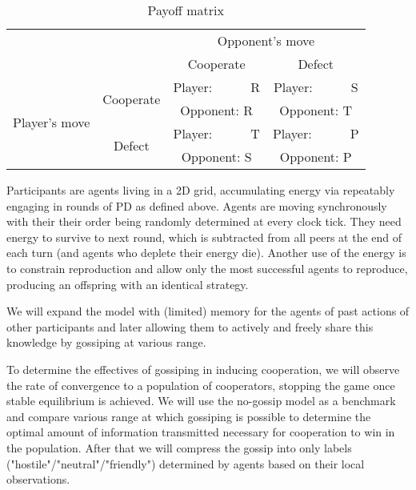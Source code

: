\documentclass[english]{article}
\begin{document}
\begin{table}[h!]
  \centering
  \begin{tabular}{c c||c|c}
    & & \multicolumn{2}{c}{Opponent's move} \\
    & & Cooperate & Defect \\
    \hline\hline

    \multirow{4}{6em}{Player's move}
    & \multirow{2}{5em}{Cooperate}
      & Player:\ \ \ \ \ \ R & Player:\ \ \ \ \ \ S \\
    & & Opponent: R & Opponent: T \\
    \cline{2-4}
    & \multirow{2}{5em}{Defect}
      & Player:\ \ \ \ \ \ T & Player:\ \ \ \ \ \ P \\
    & & Opponent: S & Opponent: P \\
  \end{tabular}

  \caption{Payoff matrix}
  \label{table:payoff}
\end{table}

Participants are agents living in a 2D grid, accumulating energy via repeatably engaging in rounds of PD as defined above. Agents are moving synchronously with their their order being randomly determined at every clock tick. They need energy to survive to next round, which is subtracted from all peers at the end of each turn (and agents who deplete their energy die).
Another use of the energy is to constrain reproduction and allow only the most successful agents to reproduce, producing an offspring with an identical strategy.

We will expand the model with (limited) memory for the agents of past actions of other participants and later allowing them to actively and freely share this knowledge by gossiping at various range.

To determine the effectives of gossiping in inducing cooperation, we will observe the rate of convergence to a population of cooperators, stopping the game once stable equilibrium is achieved. We will use the no-gossip model as a benchmark and compare various range at which gossiping is possible to determine the optimal amount of information transmitted necessary for cooperation to win in the population.
After that we will compress the gossip into only labels ("hostile"/"neutral"/"friendly") determined by agents based on their local observations.
\end{document}
